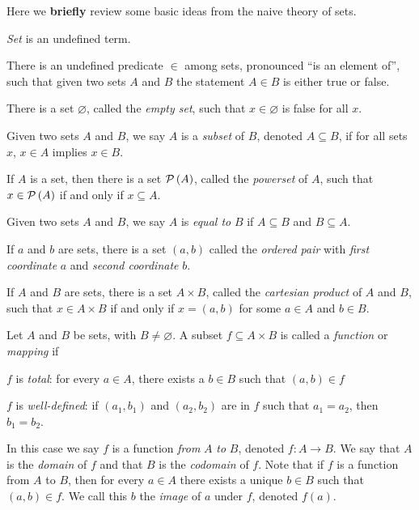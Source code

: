 Here we \textbf{briefly} review some basic ideas from the naive theory of sets.

\begin{proplist}
\item \emph{Set} is an undefined term.

\item There is an undefined predicate \(\in\) among sets, pronounced ``is an element of'', such that given two sets \(A\) and \(B\) the statement \(A \in B\) is either true or false.

\item There is a set \(\varnothing\), called the \emph{empty set}, such that \(x \in \varnothing\) is false for all \(x\).

\item Given two sets \(A\) and \(B\), we say \(A\) is a \emph{subset} of \(B\), denoted \(A \subseteq B\), if for all sets \(x\), \(x \in A\) implies \(x \in B\).

\item If \(A\) is a set, then there is a set \(\mathcal{P}\left(A\right)\), called the \emph{powerset} of \(A\), such that \(x \in \mathcal{P}\left(A\right)\) if and only if \(x \subseteq A\).

\item Given two sets \(A\) and \(B\), we say \(A\) is \emph{equal to} \(B\) if \(A \subseteq B\) and \(B \subseteq A\).

\item If \(a\) and \(b\) are sets, there is a set \((a,b)\) called the \emph{ordered pair} with \emph{first coordinate} \(a\) and \emph{second coordinate} \(b\).

\item If \(A\) and \(B\) are sets, there is a set \(A \times B\), called the \emph{cartesian product} of \(A\) and \(B\), such that \(x \in A \times B\) if and only if \(x = (a,b)\) for some \(a \in A\) and \(b \in B\).

\item Let \(A\) and \(B\) be sets, with \(B \neq \varnothing\).
A subset \(f \subseteq A \times B\) is called a \emph{function} or \emph{mapping} if
\begin{proplist}
\item \(f\) is \emph{total}: for every \(a \in A\), there exists a \(b \in B\) such that \((a,b) \in f\)
\item \(f\) is \emph{well-defined}: if \((a_1,b_1)\) and \((a_2,b_2)\) are in \(f\) such that \(a_1 = a_2\), then \(b_1 = b_2\).
\end{proplist}
In this case we say \(f\) is a function \emph{from} \(A\) \emph{to} \(B\), denoted \(f : A \rightarrow B\).
We say that \(A\) is the \emph{domain} of \(f\) and that \(B\) is the \emph{codomain} of \(f\).
Note that if \(f\) is a function from \(A\) to \(B\), then for every \(a \in A\) there exists a unique \(b \in B\) such that \((a,b) \in f\).
We call this \(b\) the \emph{image} of \(a\) under \(f\), denoted \(f(a)\).


\end{proplist}
